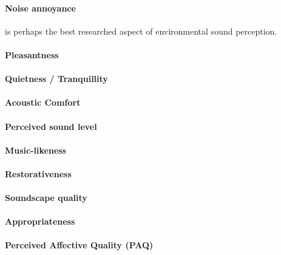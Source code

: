     \paragraph{Noise annoyance} is perhaps the best researched aspect of environmental sound perception.

    \paragraph{Pleasantness}

    \paragraph{Quietness / Tranquillity}

    \paragraph{Acoustic Comfort}

    \paragraph{Perceived sound level}

    \paragraph{Music-likeness}

    \paragraph{Restorativeness}

    \paragraph{Soundscape quality}

    \paragraph{Appropriateness}

    \paragraph{Perceived Affective Quality (PAQ)}

